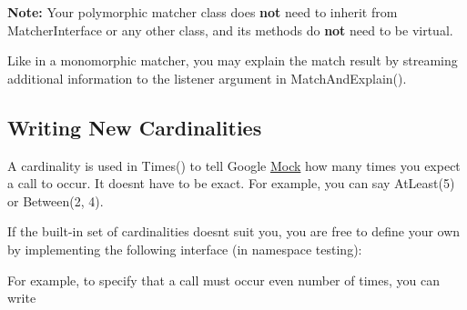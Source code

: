 {\bfseries{Note\+:}} Your polymorphic matcher class does {\bfseries{not}} need to inherit from {\ttfamily Matcher\+Interface} or any other class, and its methods do {\bfseries{not}} need to be virtual.

Like in a monomorphic matcher, you may explain the match result by streaming additional information to the {\ttfamily listener} argument in {\ttfamily Match\+And\+Explain()}.

\subsection*{Writing New Cardinalities}

A cardinality is used in {\ttfamily Times()} to tell Google \mbox{\hyperlink{class_mock}{Mock}} how many times you expect a call to occur. It doesn\textquotesingle{}t have to be exact. For example, you can say {\ttfamily At\+Least(5)} or {\ttfamily Between(2, 4)}.

If the built-\/in set of cardinalities doesn\textquotesingle{}t suit you, you are free to define your own by implementing the following interface (in namespace {\ttfamily testing})\+:


\begin{DoxyCode}{0}
\DoxyCodeLine{ \textcolor{keyword}{public}:}
\DoxyCodeLine{}
\DoxyCodeLine{  \textcolor{comment}{// Returns true iff call\_count calls will satisfy this cardinality.}}
\DoxyCodeLine{}
\DoxyCodeLine{  \textcolor{comment}{// Returns true iff call\_count calls will saturate this cardinality.}}
\DoxyCodeLine{}
\DoxyCodeLine{  \textcolor{comment}{// Describes self to an ostream.}}
\DoxyCodeLine{\};}
\end{DoxyCode}


For example, to specify that a call must occur even number of times, you can write


